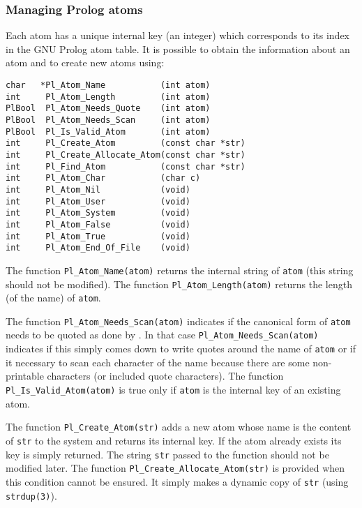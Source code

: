 \subsubsection{Managing Prolog atoms}

Each atom has a unique internal key (an integer) which corresponds to its index in the
GNU Prolog atom table. It is possible to obtain the information about an atom
and to create new atoms using:

\begin{Indentation}
\begin{verbatim}
char   *Pl_Atom_Name           (int atom)
int     Pl_Atom_Length         (int atom)
PlBool  Pl_Atom_Needs_Quote    (int atom)
PlBool  Pl_Atom_Needs_Scan     (int atom)
PlBool  Pl_Is_Valid_Atom       (int atom)
int     Pl_Create_Atom         (const char *str)
int     Pl_Create_Allocate_Atom(const char *str)
int     Pl_Find_Atom           (const char *str)
int     Pl_Atom_Char           (char c)
int     Pl_Atom_Nil            (void)
int     Pl_Atom_User           (void)
int     Pl_Atom_System         (void)
int     Pl_Atom_False          (void)
int     Pl_Atom_True           (void)
int     Pl_Atom_End_Of_File    (void)
\end{verbatim}
\end{Indentation}

The function \texttt{Pl\_Atom\_Name(atom)} returns the internal string of
\texttt{atom} (this string should not be modified). The function
\texttt{Pl\_Atom\_Length(atom)} returns the length (of the name) of
\texttt{atom}.

The function \texttt{Pl\_Atom\_Needs\_Scan(atom)} indicates if the canonical
form of \texttt{atom} needs to be quoted as done by 
. In that case \texttt{Pl\_Atom\_Needs\_Scan(atom)}
indicates if this simply comes down to write quotes around the name of
\texttt{atom} or if it necessary to scan each character of the name because
there are some non-printable characters (or included quote characters). The
function \texttt{Pl\_Is\_Valid\_Atom(atom)} is true only if \texttt{atom} is the
internal key of an existing atom.

The function \texttt{Pl\_Create\_Atom(str)} adds a new atom whose name is the
content of \texttt{str} to the system and returns its internal key. If the
atom already exists its key is simply returned. The string \texttt{str}
passed to the function should not be modified later. The function
\texttt{Pl\_Create\_Allocate\_Atom(str)} is provided when this condition cannot
be ensured. It simply makes a dynamic copy of \texttt{str}
(using \texttt{strdup(3)}).

